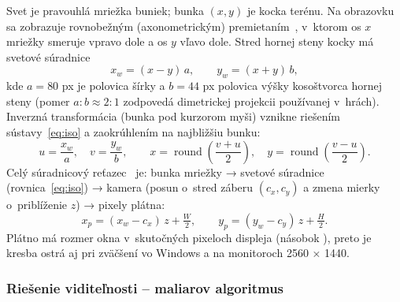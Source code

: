 \documentclass[11pt, a4paper]{article}
\begin{document}
Svet je pravouhlá mriežka buniek; bunka $(x, y)$ je kocka terénu. Na obrazovku sa zobrazuje
rovnobežným (axonometrickým) premietaním~\cite[kap.~5]{Sobota2024}, v~ktorom os $x$ mriežky
smeruje vpravo dole a os $y$ vľavo dole. Stred hornej steny kocky má svetové súradnice
\begin{equation}
  x_w = (x - y)\, a, \qquad y_w = (x + y)\, b,
  \label{eq:iso}
\end{equation}
kde $a = 80$ px je polovica šírky a $b = 44$ px polovica výšky kosoštvorca hornej steny
(pomer $a : b \approx 2 : 1$ zodpovedá dimetrickej projekcii používanej v~hrách).
Inverzná transformácia (bunka pod kurzorom myši) vznikne riešením sústavy~\eqref{eq:iso}
a zaokrúhlením na najbližšiu bunku:
\begin{equation}
  u = \frac{x_w}{a},\quad v = \frac{y_w}{b},\qquad
  x = \operatorname{round}\!\left(\frac{v + u}{2}\right),\quad
  y = \operatorname{round}\!\left(\frac{v - u}{2}\right).
\end{equation}
Celý súradnicový reťazec~\cite[kap.~4]{Sobota2024} je: bunka mriežky → svetové súradnice
(rovnica~\ref{eq:iso}) → kamera (posun o~stred záberu $(c_x, c_y)$ a zmena mierky
o~priblíženie $z$) → pixely plátna:
\begin{equation}
  x_p = (x_w - c_x)\,z + \tfrac{W}{2}, \qquad y_p = (y_w - c_y)\,z + \tfrac{H}{2}.
  \label{eq:kamera}
\end{equation}
Plátno má rozmer okna v~skutočných pixeloch displeja (násobok ),
preto je kresba ostrá aj pri zväčšení vo Windows a na monitoroch 2560 × 1440.

\subsubsection{Riešenie viditeľnosti – maliarov algoritmus}
\end{document}
